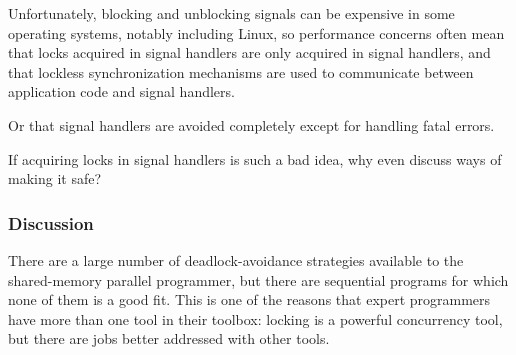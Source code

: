 Unfortunately, blocking and unblocking signals can be expensive in
some operating systems, notably including Linux, so performance
concerns often mean that locks acquired in signal handlers are only
acquired in signal handlers, and that lockless synchronization
mechanisms are used to communicate between application code and
signal handlers.

Or that signal handlers are avoided completely except for handling
fatal errors.

\QuickQuiz{}
	If acquiring locks in signal handlers is such a bad idea, why
	even discuss ways of making it safe?
 \QuickQuizEnd

\subsubsection{Discussion}
\label{sec:locking:Locking Hierarchy Discussion}

There are a large number of deadlock-avoidance strategies available to
the shared-memory parallel programmer, but there are sequential
programs for which none of them is a good fit.
This is one of the reasons that expert programmers have more than
one tool in their toolbox: locking is a powerful concurrency
tool, but there are jobs better addressed with other tools.

